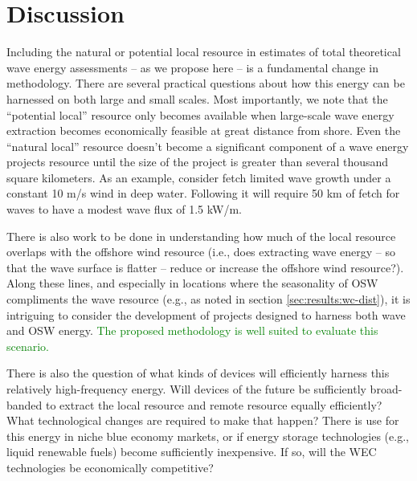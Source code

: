 \section{Discussion} \label{sec:discussion}

Including the natural or potential local resource in estimates of total theoretical wave energy assessments -- as we propose here -- is a fundamental change in methodology. There are several practical questions about how this energy can be harnessed on both large and small scales. 
Most importantly, we note that the ``potential local'' resource only becomes available when large-scale wave energy extraction becomes economically feasible at great distance from shore. Even the ``natural local'' resource doesn't become a significant component of a wave energy projects resource until the size of the project is greater than several thousand square kilometers. As an example, consider fetch limited wave growth under a constant 10 m/s wind in deep water. Following \citet{donelan1980similarity} it will require 50 km of fetch for waves to have a modest wave flux of 1.5 kW/m. 

There is also work to be done in understanding how much of the local resource overlaps with the offshore wind resource (i.e., does extracting wave energy -- so that the wave surface is flatter -- reduce or increase the offshore wind resource?). Along these lines, and especially in locations where the seasonality of OSW compliments the wave resource (e.g., as noted in section \ref{sec:results:wc-dist}), it is intriguing to consider the development of projects designed to harness both wave and OSW energy. \textcolor{green}{The proposed methodology is well suited to evaluate this scenario.}

There is also the question of what kinds of devices will efficiently harness this relatively high-frequency energy. 
Will devices of the future be sufficiently broad-banded to extract the local resource and remote resource equally efficiently? 
What technological changes are required to make that happen? There is use for this energy in niche blue economy markets, or if energy storage technologies (e.g., liquid renewable fuels) become sufficiently inexpensive. If so, will the WEC technologies be economically competitive? 

